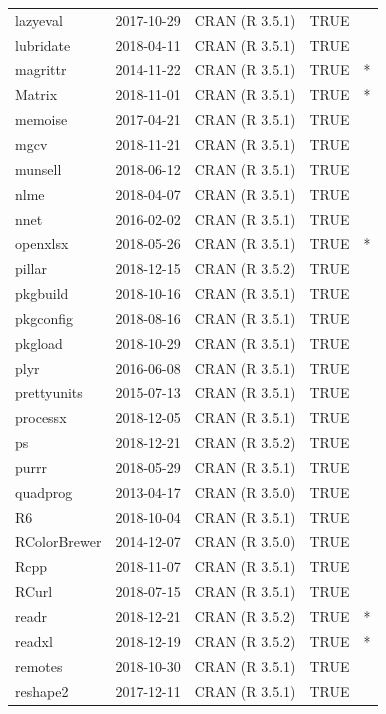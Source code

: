 \documentclass{grattan}\usepackage[]{graphicx}\usepackage[]{color}
\begin{document}
\begin{longtable}{lllll}
  lazyeval & 2017-10-29 & CRAN (R 3.5.1) & TRUE &  \\ 
  lubridate & 2018-04-11 & CRAN (R 3.5.1) & TRUE &  \\ 
  magrittr & 2014-11-22 & CRAN (R 3.5.1) & TRUE & * \\ 
  Matrix & 2018-11-01 & CRAN (R 3.5.1) & TRUE & * \\ 
  memoise & 2017-04-21 & CRAN (R 3.5.1) & TRUE &  \\ 
  mgcv & 2018-11-21 & CRAN (R 3.5.1) & TRUE &  \\ 
  munsell & 2018-06-12 & CRAN (R 3.5.1) & TRUE &  \\ 
  nlme & 2018-04-07 & CRAN (R 3.5.1) & TRUE &  \\ 
  nnet & 2016-02-02 & CRAN (R 3.5.1) & TRUE &  \\ 
  openxlsx & 2018-05-26 & CRAN (R 3.5.1) & TRUE & * \\ 
  pillar & 2018-12-15 & CRAN (R 3.5.2) & TRUE &  \\ 
  pkgbuild & 2018-10-16 & CRAN (R 3.5.1) & TRUE &  \\ 
  pkgconfig & 2018-08-16 & CRAN (R 3.5.1) & TRUE &  \\ 
  pkgload & 2018-10-29 & CRAN (R 3.5.1) & TRUE &  \\ 
  plyr & 2016-06-08 & CRAN (R 3.5.1) & TRUE &  \\ 
  prettyunits & 2015-07-13 & CRAN (R 3.5.1) & TRUE &  \\ 
  processx & 2018-12-05 & CRAN (R 3.5.1) & TRUE &  \\ 
  ps & 2018-12-21 & CRAN (R 3.5.2) & TRUE &  \\ 
  purrr & 2018-05-29 & CRAN (R 3.5.1) & TRUE &  \\ 
  quadprog & 2013-04-17 & CRAN (R 3.5.0) & TRUE &  \\ 
  R6 & 2018-10-04 & CRAN (R 3.5.1) & TRUE &  \\ 
  RColorBrewer & 2014-12-07 & CRAN (R 3.5.0) & TRUE &  \\ 
  Rcpp & 2018-11-07 & CRAN (R 3.5.1) & TRUE &  \\ 
  RCurl & 2018-07-15 & CRAN (R 3.5.1) & TRUE &  \\ 
  readr & 2018-12-21 & CRAN (R 3.5.2) & TRUE & * \\ 
  readxl & 2018-12-19 & CRAN (R 3.5.2) & TRUE & * \\ 
  remotes & 2018-10-30 & CRAN (R 3.5.1) & TRUE &  \\ 
  reshape2 & 2017-12-11 & CRAN (R 3.5.1) & TRUE &  \\ 

\end{longtable}
\end{document}
